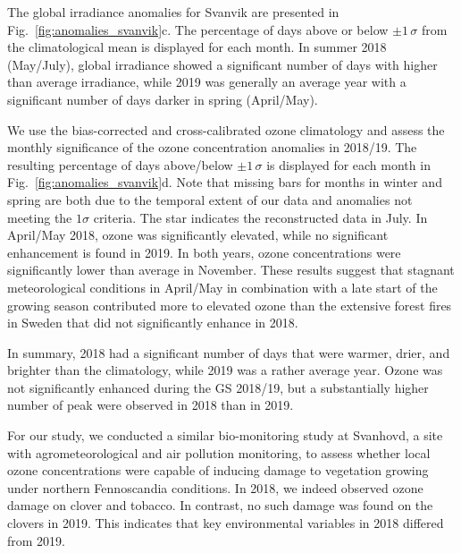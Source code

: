 \documentclass[bg, manuscript]{copernicus}
\begin{document}
The global irradiance anomalies for Svanvik are presented in Fig.~\ref{fig:anomalies_svanvik}c. The percentage of days above or below $\pm 1\,\sigma$ from the climatological mean is displayed for each month. In summer 2018 (May/July), global irradiance showed a significant number of days with higher than average irradiance, while 2019 was generally an average year with a significant number of days darker in spring (April/May).

We use the bias-corrected and cross-calibrated ozone climatology \citep{ACP:Falk2021} and assess the monthly significance of the ozone concentration anomalies in 2018/19. The resulting percentage of days above/below $\pm 1\,\sigma$ is displayed for each month in Fig.~\ref{fig:anomalies_svanvik}d. Note that missing bars for months in winter and spring are both due to the temporal extent of our data and anomalies not meeting the $1\sigma$ criteria. The star indicates the reconstructed data in July. In April/May 2018, ozone was significantly elevated, while no significant enhancement is found in 2019. In both years, ozone concentrations were significantly lower than average in November. These results suggest that stagnant meteorological conditions in April/May in combination with a late start of the growing season contributed more to elevated ozone than the extensive forest fires in Sweden that did not significantly enhance \chem{[O_3]} in 2018.

In summary, 2018 had a significant number of days that were warmer, drier, and brighter than the climatology, while 2019 was a rather average year. Ozone was not significantly enhanced during the GS 2018/19, but a substantially higher number of peak \chem{[O_3]} were observed in 2018 than in 2019.


\label{sec:conc}

For our study, we conducted a similar bio-monitoring study at Svanhovd, a site with agrometeorological and air pollution monitoring, to assess whether local ozone concentrations were capable of inducing damage to vegetation growing under northern Fennoscandia conditions. In 2018, we indeed observed ozone damage on clover and tobacco. In contrast, no such damage was found on the clovers in 2019. This indicates that key environmental variables in 2018 differed from 2019.
\end{document}
